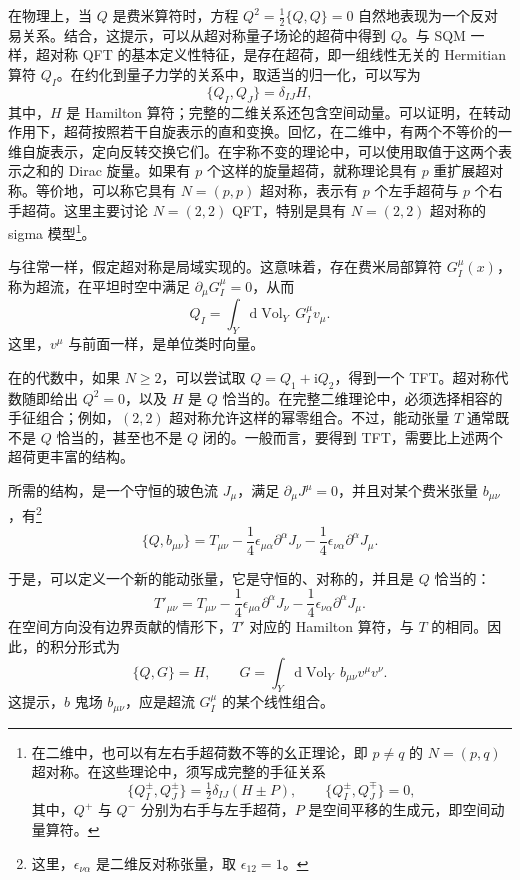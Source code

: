 在物理上，当 $Q$ 是费米算符时，方程 $Q^2=\frac12\{Q,Q\}=0$ 自然地表现为一个反对易关系。结合，这提示，可以从超对称量子场论的超荷中得到 $Q$。与 SQM 一样，超对称 QFT 的基本定义性特征，是存在超荷，即一组线性无关的 Hermitian 算符 $Q_I$。在约化到量子力学的关系中，取适当的归一化，可以写为
\begin{equation}\label{eq:3.81}
\{Q_I,Q_J\}=\delta_{IJ}H,
\end{equation}
其中，$H$ 是 Hamilton 算符；完整的二维关系还包含空间动量。可以证明，在转动作用下，超荷按照若干自旋表示的直和变换。回忆，在二维中，有两个不等价的一维自旋表示，定向反转交换它们。在宇称不变的理论中，可以使用取值于这两个表示之和的 Dirac 旋量。如果有 $p$ 个这样的旋量超荷，就称理论具有 $p$ 重扩展超对称。等价地，可以称它具有 $N=(p,p)$ 超对称，表示有 $p$ 个左手超荷与 $p$ 个右手超荷。这里主要讨论 $N=(2,2)$ QFT，特别是具有 $N=(2,2)$ 超对称的 sigma 模型\footnote{在二维中，也可以有左右手超荷数不等的幺正理论，即 $p\ne q$ 的 $N=(p,q)$ 超对称。在这些理论中，须写成完整的手征关系
\[
\{Q_I^\pm,Q_J^\pm\}
=\tfrac12\delta_{IJ}(H\pm P),
\qquad\{Q_I^\pm,Q_J^\mp\}=0,
\]
其中，$Q^+$ 与 $Q^-$ 分别为右手与左手超荷，$P$ 是空间平移的生成元，即空间动量算符。}。

与往常一样，假定超对称是局域实现的。这意味着，存在费米局部算符 $G_I^\mu(x)$，称为超流，在平坦时空中满足 $\partial_\mu G_I^\mu=0$，从而
\[
Q_I=\int_Y\mathrm{d}\operatorname{Vol}_Y\,G_I^\mu v_\mu.
\]
这里，$v^\mu$ 与前面一样，是单位类时向量。

在的代数中，如果 $N\ge2$，可以尝试取 $Q=Q_1+\mathrm{i}Q_2$，得到一个 TFT。超对称代数随即给出 $Q^2=0$，以及 $H$ 是 $Q$ 恰当的。在完整二维理论中，必须选择相容的手征组合；例如，$(2,2)$ 超对称允许这样的幂零组合。不过，能动张量 $T$ 通常既不是 $Q$ 恰当的，甚至也不是 $Q$ 闭的。一般而言，要得到 TFT，需要比上述两个超荷更丰富的结构。

所需的结构，是一个守恒的玻色流 $J_\mu$，满足 $\partial_\mu J^\mu=0$，并且对某个费米张量 $b_{\mu\nu}$，有\footnote{这里，$\epsilon_{\nu\alpha}$ 是二维反对称张量，取 $\epsilon_{12}=1$。}
\begin{equation}\label{eq:3.82}
\{Q,b_{\mu\nu}\}
=T_{\mu\nu}-\frac14\epsilon_{\mu\alpha}\partial^\alpha J_\nu
-\frac14\epsilon_{\nu\alpha}\partial^\alpha J_\mu.
\end{equation}

于是，可以定义一个新的能动张量，它是守恒的、对称的，并且是 $Q$ 恰当的：
\begin{equation}\label{eq:3.83}
T'_{\mu\nu}=T_{\mu\nu}
-\frac14\epsilon_{\mu\alpha}\partial^\alpha J_\nu
-\frac14\epsilon_{\nu\alpha}\partial^\alpha J_\mu.
\end{equation}
在空间方向没有边界贡献的情形下，$T'$ 对应的 Hamilton 算符，与 $T$ 的相同。因此，的积分形式为
\[
\{Q,G\}=H,
\qquad
G=\int_Y\mathrm{d}\operatorname{Vol}_Y\,b_{\mu\nu}v^\mu v^\nu.
\]
这提示，$b$ 鬼场 $b_{\mu\nu}$，应是超流 $G_I^\mu$ 的某个线性组合。

